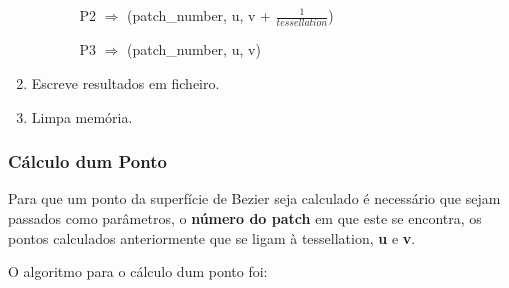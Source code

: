 \documentclass[a4paper]{article}
\begin{document}
\begin{enumerate}
\begin{enumerate}
\begin{enumerate}
      		\vspace{0.2cm}

          	P2 $\Rightarrow$ (patch\_number, u, v + $\frac{1}{tessellation}$)

      		\vspace{0.2cm}

          	P3 $\Rightarrow$ (patch\_number, u, v)

      		\vspace{0.2cm}

	\end{enumerate}
  \end{enumerate}
  \item Escreve resultados em ficheiro.
  \item Limpa memória.
\end{enumerate}
\rmfamily

\subsubsection{Cálculo dum Ponto}

Para que um ponto da superfície de Bezier seja calculado é necessário que sejam passados como parâmetros, o \textbf{número do patch} em que este se encontra, os pontos calculados anteriormente que se ligam à tessellation, \textbf{u} e \textbf{v}.

O algoritmo para o cálculo dum ponto foi:
\end{document}
